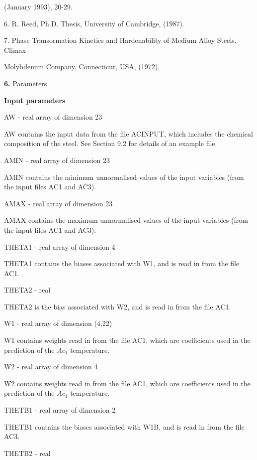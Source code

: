 (January 1993), 20-29.
\medskip
\item {} 6. R. Reed, Ph.D. Thesis, University of Cambridge, (1987).
\medskip
\item {} 7. Phase Transormation Kinetics and Hardenability of Medium Alloy
Steels, Climax \item {} Molybdenum Company, Connecticut, USA, (1972).
\item{\bf 6.} {\largeb  Parameters}
\bigskip
\item {} {\bf Input parameters}
\bigskip
\item {} AW - real array of dimension 23
\item {} \indent AW contains the input data from the file ACINPUT, which
includes the chemical \indent composition of the steel. See Section 9.2 for details
of an example file.
\medskip
\item {} AMIN - real array of dimension 23
\item {} \indent AMIN contains the minimum unnormalised values of the input
variables (from the \indent input files AC1 and AC3).
\medskip
\item {} AMAX - real array of dimension 23
\item {} \indent AMAX contains the maximum unnormalised values of the input 
variables (from the \indent input files AC1 and AC3).
\medskip
\item {} THETA1 - real array of dimension 4
\item {} \indent THETA1 contains the biases associated with W1, and is
read in from the file AC1.
\medskip
\item {} THETA2 - real 
\item {} \indent THETA2 is the bias associated with W2, and is read
in from the file AC1.
\medskip
\item {} W1 - real array of dimension (4,22)
\item {} \indent W1 contains weights read in from the file AC1, which are
coefficients used in the \indent prediction of the $Ac_1$ temperature.
\medskip
\item {} W2 - real array of dimension 4
\item {} \indent W2 contains weights read in from the file AC1, which are
coefficients used in the \indent  prediction of the $Ac_1$ temperature.
\medskip
\item {} THETB1 - real array of dimension 2
\item {} \indent THETB1 contains the biases associated with W1B, and is read
in from the file AC3.
\medskip
\item {} THETB2 - real 
